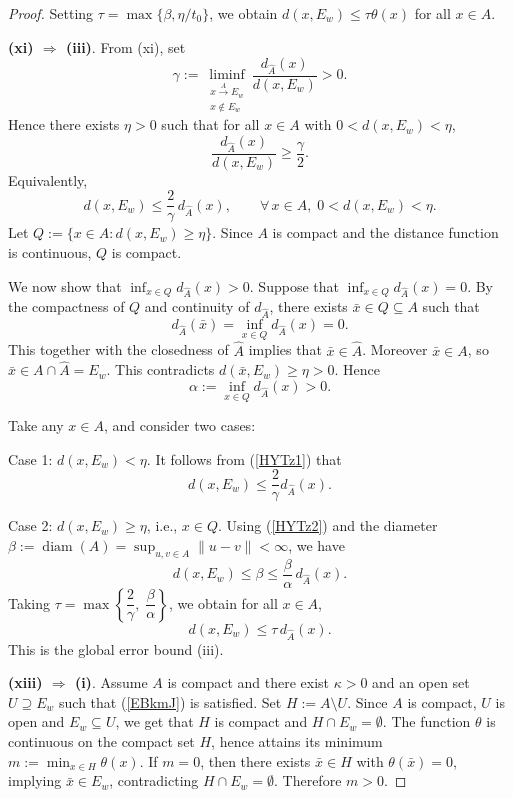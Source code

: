 \documentclass[10pt,a4paper]{amsart}
\begin{document}
\begin{proof}
	Setting \(\tau = \max\{\beta, \eta/t_0\}\), we obtain \(d(x, E_w) \le \tau \theta(x)\) for all \(x \in A\). 
	
	\noindent\textbf{(xi) $\Rightarrow$ (iii)}.
	From (xi), set
	\[
	\gamma := \liminf_{\substack{x\xrightarrow{A}E_w\\ x\notin E_w}} \frac{d_{\widehat{A}}(x)}{d(x,E_w)} > 0.
	\]
	Hence there exists $\eta>0$ such that for all $x\in A$ with $0<d(x,E_w)<\eta$,
	\[
	\frac{d_{\widehat{A}}(x)}{d(x,E_w)} \ge \frac{\gamma}{2} .
	\]
	Equivalently,
\begin{equation}\label{HYTz1}
	d(x,E_w) \le \frac{2}{\gamma}\, d_{\widehat{A}}(x), \qquad \forall\,x\in A,\; 0<d(x,E_w)<\eta.  
 \end{equation}
		Let $Q := \{x\in A : d(x,E_w)\ge \eta\}$. Since $A$ is compact and the distance function is continuous, $Q$ is compact.
	
	We now show that $\inf_{x\in Q} d_{\widehat{A}}(x) > 0$.
	Suppose that  $\inf_{x\in Q} d_{\widehat{A}}(x) = 0$.   By the compactness of $Q$ and continuity of $d_{\widehat{A}}$,  there exists  $\bar{x}\in Q \subseteq A$ such that
	$$d_{\widehat{A}}(\bar{x})=  \inf_{x\in Q} d_{\widehat{A}}(x) = 0 .$$
	This together with  the  closedness of  $\widehat{A}$  implies that $\bar{x}\in \widehat{A}$.
	 Moreover $\bar{x}\in A$, so $\bar{x}\in A\cap\widehat{A}=E_w$. This contradicts $d(\bar{x},E_w)\ge \eta>0$. Hence
\begin{equation}\label{HYTz2}
	\alpha := \inf_{x\in Q} d_{\widehat{A}}(x) >0.  
 \end{equation}
	
	Take any $x\in A$, and consider two cases:
 
 Case 1:  $d(x,E_w)<\eta$.  It follows from  (\ref{HYTz1})  that
		\[
		d(x,E_w)\le \frac{2}{\gamma} d_{\widehat{A}}(x).
		\]
		
	  Case 2:   $d(x,E_w)\ge \eta$, i.e., $x\in Q$. Using  (\ref{HYTz2})    and the diameter $\beta :=\operatorname{diam}(A)=\sup_{u,v\in A}\|u-v\|<\infty$,  we have 
		\[
		d(x,E_w) \le \beta \le \frac{\beta}{\alpha}\, d_{\widehat{A}}(x).
		\]
 	Taking $\tau = \max\left\{\dfrac{2}{\gamma},\; \dfrac{\beta}{\alpha}\right\}$, we obtain for all $x\in A$,
	\[
	d(x,E_w) \le \tau\, d_{\widehat{A}}(x).
	\]
	This is the global error bound (iii).
	
	\noindent\textbf{(xiii) $\Rightarrow$ (i)}.
	Assume $A$ is compact   and there exist $\kappa>0$ and an open set $U\supseteq E_w$ such that
  (\ref{EBkmJ})  is satisfied.   
	Set $H:=A\setminus U$.   Since   $A$ is compact, $U$ is open and $E_w \subseteq U$,  we get that  $H$ is compact   and $H\cap E_w= \emptyset$.
	The function $\theta$ is continuous on the compact set $H$, hence attains its minimum $m:=\min_{x\in H}\theta(x)$.
	If $m=0$, then there exists $\bar x\in H$ with $\theta(\bar x)=0$, implying $\bar x\in E_w$, contradicting $H\cap E_w= \emptyset$. Therefore $m>0$.
	

\end{proof}
\end{document}

